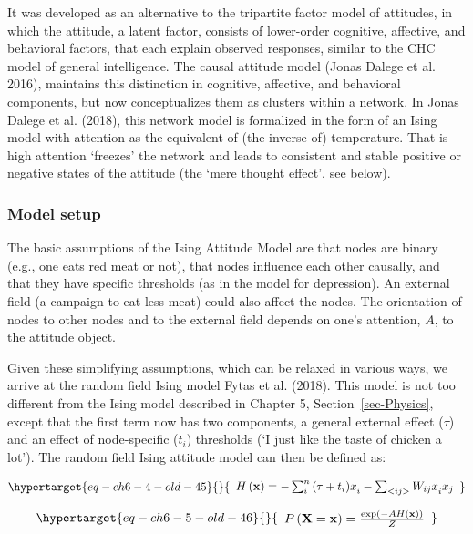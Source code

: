 \documentclass[
  a4paper,
  DIV=11,
  numbers=noendperiod,
  oneside]{scrreprt}
\begin{document}
It was developed as an alternative to the tripartite factor model of
attitudes, in which the attitude, a latent factor, consists of
lower-order cognitive, affective, and behavioral factors, that each
explain observed responses, similar to the CHC model of general
intelligence. The causal attitude model (Jonas Dalege et al. 2016),
maintains this distinction in cognitive, affective, and behavioral
components, but now conceptualizes them as clusters within a network. In
Jonas Dalege et al. (2018), this network model is formalized in the form
of an Ising model with attention as the equivalent of (the inverse of)
temperature. That is high attention `freezes' the network and leads to
consistent and stable positive or negative states of the attitude (the
`mere thought effect', see below).

\hypertarget{sec-Model-setup}{%
\subsubsection{Model setup}\label{sec-Model-setup}}

The basic assumptions of the Ising Attitude Model are that nodes are
binary (e.g., one eats red meat or not), that nodes influence each other
causally, and that they have specific thresholds (as in the model for
depression). An external field (a campaign to eat less meat) could also
affect the nodes. The orientation of nodes to other nodes and to the
external field depends on one's attention, \(A\), to the attitude
object.

Given these simplifying assumptions, which can be relaxed in various
ways, we arrive at the random field Ising model Fytas et al. (2018).
This model is not too different from the Ising model described in
Chapter 5, Section~\ref{sec-Physics}, except that the first term now has
two components, a general external effect (\(\tau\)) and an effect of
node-specific (\(t_{i}\)) thresholds (`I just like the taste of chicken
a lot'). The random field Ising attitude model can then be defined as:

\begin{equation}\protect\hypertarget{eq-ch6-4-old-45}{}{\begin{array}{r}
H\left( \mathbf{x} \right) = - \sum_{i}^{n}{(\tau + {t_{i})x}_{i}} - \sum_{< ij >}^{}{{W_{ij}x}_{i}x_{j}}
\end{array}}\label{eq-ch6-4-old-45}\end{equation}

\begin{equation}\protect\hypertarget{eq-ch6-5-old-46}{}{\begin{array}{r}
P\left( \mathbf{X} = \mathbf{x} \right) = \frac{\exp\left( - AH\left( \mathbf{x} \right) \right)}{Z}
\end{array}}\label{eq-ch6-5-old-46}\end{equation}
\end{document}
